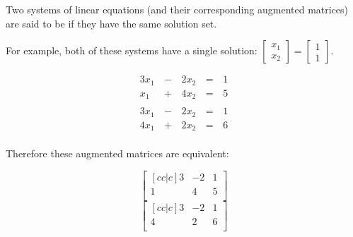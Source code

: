 \begin{applicationActivities}
\begin{definition}
  Two systems of linear equations (and their corresponding augmented
  matrices) are said to be  if they have the same
  solution set.

  For example, both of these systems have a single solution:
  \(\begin{bmatrix} x_1 \\ x_2 \end{bmatrix} = \begin{bmatrix} 1 \\ 1\end{bmatrix}\).

  \begin{multicols}{2}\noindent
    \begin{alignat*}{3}
      3x_1 &\,-\,& 2x_2 &\,=\,& 1 \\
      x_1 &\,+\,& 4x_2 &\,=\,& 5 \\
    \end{alignat*}
    \begin{alignat*}{3}
      3x_1 &\,-\,& 2x_2 &\,=\,& 1 \\
      4x_1 &\,+\,& 2x_2 &\,=\,& 6 \\
    \end{alignat*}
  \end{multicols}

  Therefore these augmented matrices are equivalent:

  \begin{multicols}{2}\noindent
    \[
      \begin{bmatrix}[cc|c]
        3 & -2 & 1\\
        1 &  4 & 5\\
      \end{bmatrix}
    \]
    \[
      \begin{bmatrix}[cc|c]
        3 & -2 & 1\\
        4 &  2 & 6\\
      \end{bmatrix}
    \]
  \end{multicols}
\end{definition}


\end{applicationActivities}
